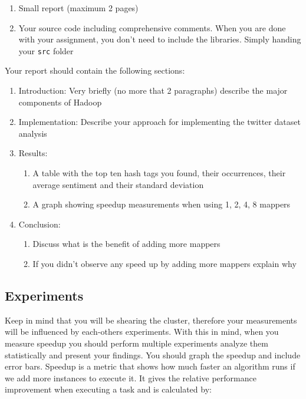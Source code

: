 \documentclass[a4paper,10pt]{article}
\begin{document}
  \begin{enumerate}
    \item Small report (maximum 2 pages) 
    \item Your source code including comprehensive comments. When you are done with your assignment, you don't need to include the libraries. Simply handing your \texttt{src} folder 
  \end{enumerate}
  
  
  Your report should contain the following sections:
  
  \begin{enumerate}
    \item Introduction: Very briefly (no more that 2 paragraphs) describe the major components of Hadoop
    \item Implementation: Describe your approach for implementing the twitter dataset analysis 
    \item Results: 
    \begin{enumerate}
      \item A table with the top ten hash tags you found, their occurrences, their average sentiment and their standard deviation
      \item A graph showing speedup measurements when using 1, 2, 4, 8 mappers
    \end{enumerate}
    \item Conclusion: 
    \begin{enumerate}
      \item Discuss what is the benefit of adding more mappers
      \item If you didn't observe any speed up by adding more mappers explain why
    \end{enumerate}
    
  \end{enumerate}
  
  
  \subsection{Experiments}
  Keep in mind that you will be shearing the cluster, therefore your measurements will be influenced by each-others experiments. 
  With this in mind, when you measure speedup you should perform multiple experiments analyze them statistically and present your findings. 
  You should graph the speedup and include error bars. Speedup is a metric that shows how much faster an algorithm runs if we add more instances to execute it. It gives the relative performance improvement when executing a task and is calculated by: 
  
\end{document}
